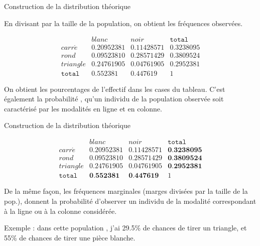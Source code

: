 \documentclass{beamer}
\begin{document}
\begin{frame}{ Construction de la distribution théorique}

En divisant par la taille de la population, on obtient les \alert{fréquences observées}.

$$\begin{array}{c|c|c|c}
   & blanc & noir & \texttt{total}\\ 
   \hline
carr\acute{e} &  0.20952381&  0.11428571 &  0.3238095\\ 
  \hline
  rond &    0.09523810 & 0.28571429 & 0.3809524  \\ 
    \hline
  triangle & 0.24761905 & 0.04761905 &   0.2952381\\
  \hline
  \texttt{total} &  0.552381 & 0.447619 & 1
  \end{array}$$



\vspace{0.5cm}

\begin{small}
On obtient les \alert{pourcentages de l'effectif} dans les cases du tableau.
C'est également la \alert{probabilité} , qu'un individu de la population \alert{observée} soit caractérisé par les modalités en ligne et en colonne.
\end{small}
\end{frame}


\begin{frame}{ Construction de la distribution théorique}


$$\begin{array}{c|c|c|c}
   & blanc & noir & \texttt{total}\\ 
   \hline
carr\acute{e} &  0.20952381&  0.11428571 &  \textbf{0.3238095}\\ 
  \hline
  rond &    0.09523810 & 0.28571429 & \textbf{0.3809524}  \\ 
    \hline
  triangle & 0.24761905 & 0.04761905 &   \textbf{0.2952381}\\
  \hline
  \texttt{total} &  \textbf{0.552381} & \textbf{0.447619} & 1
  \end{array}$$


De la même façon, les \alert{fréquences marginales} (marges divisées par la taille de la pop.), donnent la \alert{probabilité} d'observer un individu de la modalité correspondant à la ligne ou à la colonne considérée.

\begin{tiny}
\begin{spacing}{0.75}
Exemple : dans cette population , j'ai 29.5\% de chances de tirer un triangle, et 55\% de chances de tirer une pièce blanche.
\end{spacing}
\end{tiny}


\end{frame}
\end{document}
